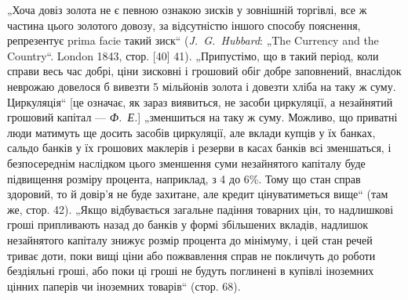„Хоча довіз золота не є певною ознакою зисків у зовнішній
торгівлі, все ж частина цього золотого довозу, за відсутністю
іншого способу пояснення, репрезентує prima facie такий зиск“
(\emph{J.~G.~Hubbard}: „The Currency and the Country“. London 1843,
стор. [40] 41). „Припустімо, що в такий період, коли справи
весь час добрі, ціни зисковні і грошовий обіг добре заповнений,
внаслідок неврожаю довелося б вивезти 5 мільйонів
золота і довезти хліба на таку ж суму. Циркуляція“ [це означає, як зараз виявиться, не засоби
циркуляції, а незайнятий грошовий капітал — \emph{Ф.~Е.}] „зменшиться на таку ж суму. Можливо, що приватні
люди матимуть ще досить засобів циркуляції,
але вклади купців у їх банках, сальдо банків у їх грошових маклерів і резерви в касах банків всі
зменшаться, і безпосереднім
наслідком цього зменшення суми незайнятого капіталу буде підвищення розміру процента, наприклад, з 4
до 6\%. Тому що стан
справ здоровий, то й довір’я не буде захитане, але кредит цінуватиметься вище“ (там же, стор. 42).
„Якщо відбувається загальне
падіння товарних цін, то надлишкові гроші припливають назад
до банків у формі збільшених вкладів, надлишок незайнятого капіталу знижує розмір процента до
мінімуму, і цей стан речей
триває доти, поки вищі ціни або пожвавлення справ не покличуть
до роботи бездіяльні гроші, або поки ці гроші не будуть поглинені в купівлі іноземних цінних паперів
чи іноземних товарів“ (стор. 68).


